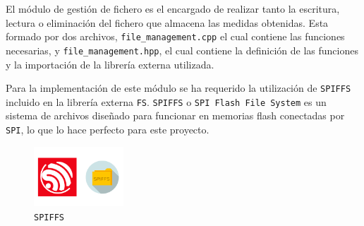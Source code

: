 El módulo de gestión de fichero es el encargado de realizar tanto la escritura, lectura o eliminación del fichero que almacena las medidas obtenidas. Esta formado por dos archivos, \texttt{file\_management.cpp} el cual contiene las funciones necesarias, y \texttt{file\_management.hpp}, el cual contiene la definición de las funciones y la importación de la librería externa utilizada.


Para la implementación de este módulo se ha requerido la utilización de \texttt{SPIFFS} incluido en la librería externa \texttt{FS}. \texttt{SPIFFS} o \texttt{SPI Flash File System} es un sistema de archivos diseñado para funcionar en memorias flash conectadas por \texttt{SPI}, lo que lo hace perfecto para este proyecto.

\begin{figure}[H]
    \centering
    \includegraphics[width=0.3\textwidth]{images/3-software/3-2-1-filemng/esp8266-spiffs.png}
    \caption{\texttt{SPIFFS}}
    \label{fig:3-2-1-1-SPIFFS}
\end{figure}

